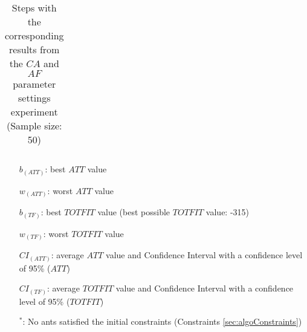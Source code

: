 \begin{sidewaystable}
\begin{tabular}{|l|l|l||c|c|c|c|c|c|}
    \hline
    \end{tabular}
    \caption {Steps with the corresponding results from the $CA$ and $AF$ parameter settings experiment (Sample size: 50)}
    \tiny
    \begin{itemize}[noitemsep]
    \item[$b_{(ATT)}$:] best $ATT$ value
    \item[$w_{(ATT)}$:] worst $ATT$ value
    \item[$b_{(TF)}$:] best $TOTFIT$ value (best possible $TOTFIT$ value: -315)
    \item[$w_{(TF)}$:] worst $TOTFIT$ value
    \item[$CI_{(ATT)}$:] average $ATT$ value and Confidence Interval with a confidence level of 95\% ($ATT$)
    \item[$CI_{(TF)}$:] average $TOTFIT$ value and Confidence Interval with a confidence level of 95\% ($TOTFIT$)
    \item[$^*$:] No ants satisfied the initial constraints (Constraints \vref{sec:algoConstraints})
    \end{itemize}
    \label{table:pm2}
\end{sidewaystable}




